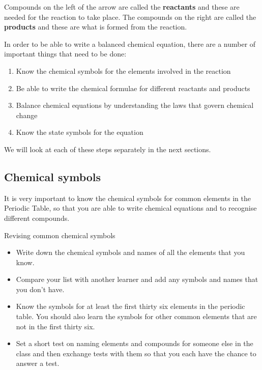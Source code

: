       \label{m38721*id62659}Compounds on the left of the arrow are called the \textbf{reactants} and these are needed for the reaction to take place. The compounds on the right are called the \textbf{products} and these are what is formed from the reaction.\par 
      \label{m38721*id62675}In order to be able to write a balanced chemical equation, there are a number of important things that need to be done:\par 
      \label{m38721*id62681}\begin{enumerate}[noitemsep, label=\textbf{\arabic*}. ] 
            \label{m38721*uid1}\item Know the chemical symbols for the elements involved in the reaction
\label{m38721*uid2}\item Be able to write the chemical formulae for different reactants and products
\label{m38721*uid3}\item Balance chemical equations by understanding the laws that govern chemical change
\label{m38721*uid4}\item Know the state symbols for the equation
\end{enumerate}
      \label{m38721*id62733}We will look at each of these steps separately in the next sections.\par 
    \label{m38721*cid2}
            \subsection*{Chemical symbols}
            \nopagebreak
      \label{m38721*id62746}It is very important to know the chemical symbols for common elements in the Periodic Table, so that you are able to write chemical equations and to recognise different compounds.\par 
\label{m38721*secfhsst!!!underscore!!!id109}
            \begin{activity}{Revising common chemical symbols
      }
            \nopagebreak
      \label{m38721*id62763}\begin{itemize}[noitemsep]
            \label{m38721*uid5}\item Write down the chemical symbols and names of all the elements that you know.
\label{m38721*uid6}\item Compare your list with another learner and add any symbols and names that you don't have.
\label{m38721*uid7}\item Know the symbols for at least the first thirty six elements in the periodic table. You should also learn the symbols for other common elements that are not in the first thirty six.
\label{m38721*uid8}\item Set a short test on naming elements and compounds for someone else in the class and then exchange tests with them so that you each have the chance to answer a test.
\end{itemize}
\end{activity}
    \label{m38721*cid3}
